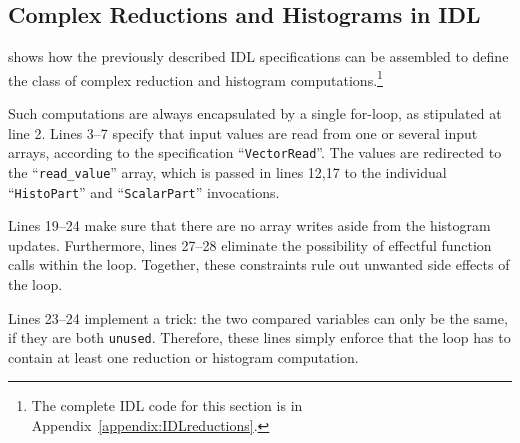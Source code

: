 \subsection{Complex Reductions and Histograms in IDL}
\label{sec:IDLCReHCs}

     shows how the previously described IDL specifications
    can be assembled to define the class of complex reduction and histogram
    computations.\footnote{The complete IDL code for this section is in
    Appendix~\ref{appendix:IDLreductions}.}

    Such computations are always encapsulated by a single for-loop, as
    stipulated at line 2.
    Lines 3--7 specify that input values are read from one or several input
    arrays, according to the specification ``{\tt VectorRead}''.
    The values are redirected to the ``{\tt read\_value}'' array, which is
    passed in lines 12,17 to the individual ``{\tt HistoPart}'' and
    ``{\tt ScalarPart}'' invocations.

    Lines 19--24 make sure that there are no array writes aside from the
    histogram updates.
    Furthermore, lines 27--28 eliminate the possibility of effectful function
    calls within the loop.
    Together, these constraints rule out unwanted side effects of the loop.

    Lines 23--24 implement a trick: the two compared variables can only be the
    same, if they are both {\tt unused}.
    Therefore, these lines simply enforce that the loop has to contain at least
    one reduction or histogram computation.

